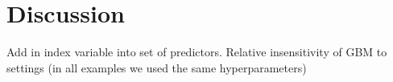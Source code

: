 \documentclass{article}
\begin{document}
\section{Discussion}
Add in index variable into set of predictors.
Relative insensitivity of GBM to settings (in all examples we used the same hyperparameters)



	

 
	
\end{document}
